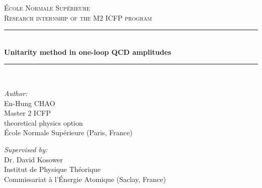 
\begin{titlepage}

\newcommand{\HRule}{\rule{\linewidth}{0.5mm}} %

\center %
 

\textsc{\LARGE {\'E}cole Normale Sup{\'e}rieure  }\\[0.3cm] %
\textsc{\Large Research internship of the M2 ICFP program}\\[0.5cm] %


\HRule \\[0.4cm]
{ \huge \bfseries Unitarity method in one-loop QCD amplitudes}\\[0.03cm] %
\HRule \\[1.5cm]

 

\begin{minipage}{0.4\textwidth}
\begin{flushleft} \large
\emph{Author:}\\
En-Hung CHAO  \\Master 2 ICFP \\theoretical physics option \\ {\'E}cole Normale Sup{\'e}rieure (Paris, France)%
~
\end{flushleft}
\end{minipage}
\begin{minipage}{0.4\textwidth}
\begin{flushright} \large
\emph{Supervised by:} \\
Dr. David Kosower \\Institut de Physique Th{\'e}orique \\Commissariat {\`a} l'{\'E}nergie Atomique (Saclay, France) %
\end{flushright}
\end{minipage}\\[1cm]


\end{titlepage}
